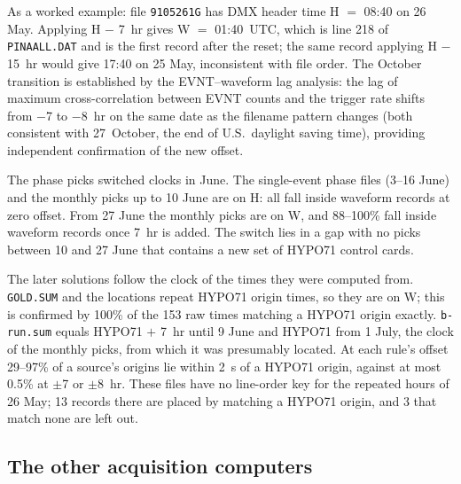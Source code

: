 \documentclass[linenum]{SSA-SRL}
\newcommand{\file}[1]{\texttt{#1}}
\begin{document}
As a worked example: file \file{9105261G} has DMX header time H $=$ 08:40 on 26 May. Applying H $-$ 7~hr gives W $=$ 01:40~UTC, which is line 218 of \file{PINAALL.DAT} and is the first record after the reset; the same record applying H $-$ 15~hr would give 17:40 on 25 May, inconsistent with file order. The October transition is established by the EVNT--waveform lag analysis: the lag of maximum cross-correlation between EVNT counts and the trigger rate shifts from $-$7 to $-$8~hr on the same date as the filename pattern changes (both consistent with 27~October, the end of U.S.\ daylight saving time), providing independent confirmation of the new offset.

The phase picks switched clocks in June. The single-event phase files (3--16 June) and the monthly picks up to 10 June are on H: all fall inside waveform records at zero offset. From 27 June the monthly picks are on W, and 88--100\% fall inside waveform records once 7~hr is added. The switch lies in a gap with no picks between 10 and 27 June that contains a new set of HYPO71 control cards.

The later solutions follow the clock of the times they were computed from. \file{GOLD.SUM} and the \citet{Jones_2001} locations repeat HYPO71 origin times, so they are on W; this is confirmed by 100\% of the 153 \citet{Jones_2001} raw times matching a HYPO71 origin exactly. \file{b-run.sum} equals HYPO71 $+$ 7~hr until 9 June and HYPO71 from 1 July, the clock of the monthly picks, from which it was presumably located. At each rule's offset 29--97\% of a source's origins lie within 2~s of a HYPO71 origin, against at most 0.5\% at $\pm$7 or $\pm$8~hr. These files have no line-order key for the repeated hours of 26 May; 13 records there are placed by matching a HYPO71 origin, and 3 that match none are left out.

\subsection{The other acquisition computers}
\end{document}
